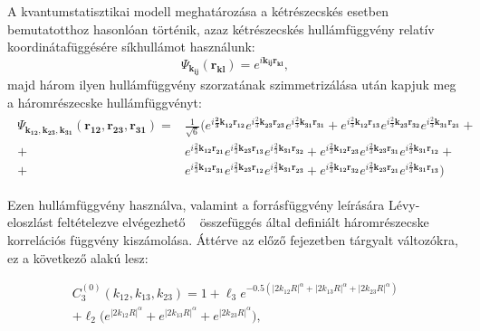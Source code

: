 \documentclass[11pt,a4paper]{article}
\numberwithin{equation}{subsection}
\numberwithin{figure}{section}
\begin{document}
A kvantumstatisztikai modell meghatározása a kétrészecskés esetben bemutatotthoz hasonlóan történik, azaz kétrészecskés hullámfüggvény relatív koordinátafüggésére síkhullámot használunk:
\begin{equation}
\Psi_{\boldsymbol{k_{ij}}}(\boldsymbol{r_{kl}})=e^{i\boldsymbol{k_{ij}}\boldsymbol{r_{kl}}},
\end{equation}
majd három ilyen hullámfüggvény szorzatának szimmetrizálása után kapjuk meg a háromrészecske hullámfüggvényt:
\begin{align}
\begin{split}
\Psi_{\boldsymbol{k_{12}},\boldsymbol{k_{23}},\boldsymbol{k_{31}}}(\boldsymbol{r_{12}},\boldsymbol{r_{23}},\boldsymbol{r_{31}})=&\frac{1}{\sqrt{6}}\Big(e^{i\boldsymbol{\frac{2}{3}k_{12}}\boldsymbol{r_{12}}}e^{i\frac{2}{3}\boldsymbol{k_{23}}\boldsymbol{r_{23}}}
e^{i\frac{2}{3}\boldsymbol{k_{31}}\boldsymbol{r_{31}}}+
e^{i\frac{2}{3}\boldsymbol{k_{12}}\boldsymbol{r_{13}}}e^{i\frac{2}{3}\boldsymbol{k_{23}}\boldsymbol{r_{32}}}
e^{i\frac{2}{3}\boldsymbol{k_{31}}\boldsymbol{r_{21}}}+\\
+&e^{i\frac{2}{3}\boldsymbol{k_{12}}\boldsymbol{r_{21}}}e^{i\frac{2}{3}\boldsymbol{k_{23}}\boldsymbol{r_{13}}}
e^{i\frac{2}{3}\boldsymbol{k_{31}}\boldsymbol{r_{32}}}+
e^{i\frac{2}{3}\boldsymbol{k_{12}}\boldsymbol{r_{23}}}e^{i\frac{2}{3}\boldsymbol{k_{23}}\boldsymbol{r_{31}}}
e^{i\frac{2}{3}\boldsymbol{k_{31}}\boldsymbol{r_{12}}}+\\
+&e^{i\frac{2}{3}\boldsymbol{k_{12}}\boldsymbol{r_{31}}}e^{i\frac{2}{3}\boldsymbol{k_{23}}\boldsymbol{r_{12}}}
e^{i\frac{2}{3}\boldsymbol{k_{31}}\boldsymbol{r_{23}}}+
e^{i\frac{2}{3}\boldsymbol{k_{12}}\boldsymbol{r_{32}}}e^{i\frac{2}{3}\boldsymbol{k_{23}}\boldsymbol{r_{21}}}
e^{i\frac{2}{3}\boldsymbol{k_{31}}\boldsymbol{r_{13}}}\Big)
\label{eq:psi3}
\end{split}
\end{align}

Ezen hullámfüggvény használva, valamint a forrásfüggvény leírására Lévy-eloszlást feltételezve elvégezhető ~ összefüggés által definiált háromrészecske korrelációs függvény kiszámolása. Áttérve az előző fejezetben tárgyalt változókra, ez a következő alakú lesz:

\begin{align}
C_3^{(0)}(k_{12}, k_{13}, k_{23}) = 1+ \ell_3e^{-0.5(|2k_{12}R|^\alpha+|2k_{13}R|^\alpha+|2k_{23}R|^\alpha)}\nonumber\\
+\ell_2\bigg(e^{|2k_{12}R|^\alpha}+e^{|2k_{13}R|^\alpha}+e^{|2k_{23}R|^\alpha}\bigg),
\end{align}
\end{document}
